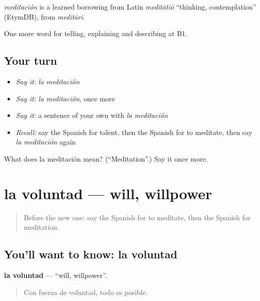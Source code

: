 \begin{cousinweb}
\emph{meditación} is a learned borrowing from Latin \emph{meditātiō} \textquotedblleft{}thinking, contemplation\textquotedblright{} (EtymDB), from \emph{meditārī}.
\end{cousinweb}

\begin{grammarlens}[title={What you've built}]
One more word for telling, explaining and describing at B1.
\end{grammarlens}

\subsection*{Your turn}
\begin{itemize}
\raggedright
  \item \emph{Say it:} \emph{la meditación}
  \item \emph{Say it:} \emph{la meditación}, once more
  \item \emph{Say it:} a sentence of your own with \emph{la meditación}
  \item \emph{Recall:} say the Spanish for talent, then the Spanish for to meditate, then say \emph{la meditación} again
\end{itemize}

\begin{tcolorbox}[breakable,colback=teal!4,colframe=teal!35!black,title={Before you move on}]
What does la meditación mean? (\textquotedblleft{}Meditation\textquotedblright{}.) Say it once more.
\end{tcolorbox}
\section[la voluntad]{la voluntad — will, willpower}

\label{lesson:ES-C767-voluntad}



\begin{quote}
Before the new one: say the Spanish for to meditate, then the Spanish for meditation.
\end{quote}

\subsection*{You'll want to know: la voluntad}
\textbf{la voluntad} — \textquotedblleft{}will, willpower\textquotedblright{}.

\begin{quote}
Con fuerza de voluntad, todo es posible.
\end{quote}

